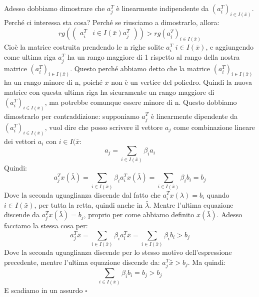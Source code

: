 \noindent Adesso dobbiamo dimostrare che $a_j^T$ è linearmente indipendente da $(a_i^T)_{i \in I(\bar{x})}$. Perché ci interessa sta cosa? Perché se riusciamo a dimostrarlo, allora:
\begin{equation*}
    rg\left(\begin{pmatrix}
    a_i^T & i \in I(\bar{x})
    a_j^T
    \end{pmatrix}\right) > rg(a_i^T)_{i \in I(\bar{x})}
\end{equation*}
Cioè la matrice costruita prendendo le n righe solite $a_i^T$ $i \in I(\bar{x})$, e aggiungendo come ultima riga $a_j^T$ ha un rango maggiore di 1 rispetto al rango della nostra matrice $(a_i^T)_{i \in I(\bar{x})}$. Questo perché abbiamo detto che la matrice $(a_i^T)_{i \in I(\bar{x})}$ ha un rango minore di n, poiché $\bar{x}$ non è un vertice del poliedro. Quindi la nuova matrice con questa ultima riga ha sicuramente un rango maggiore di $(a_i^T)_{i \in I(\bar{x})}$, ma potrebbe comunque essere minore di n. Questo dobbiamo dimostrarlo per contraddizione: supponiamo $a_j^T$ è linearmente dipendente da $(a_i^T)_{i \in I(\bar{x})}$, vuol dire che posso scrivere il vettore $a_j$ come combinazione lineare dei vettori $a_i$ con $i \in I(\bar{x}$:
\begin{equation*}
    a_j = \sum_{i \in I(\bar{x})} \beta_i a_i
\end{equation*}
Quindi:
\begin{equation*}
    a_j^Tx(\bar{\lambda}) = \sum_{i \in I(\bar{x})} \beta_i a_i^T x(\bar{\lambda}) = \sum_{i \in I(\bar{x})} \beta_i b_i = b_j
\end{equation*}
Dove la seconda uguaglianza discende dal fatto che $a_i^Tx(\lambda) = b_i$ quando $i \in I(\bar{x})$, per tutta la retta, quindi anche in $\bar{\lambda}$. Mentre l'ultima equazione discende da $a_j^Tx(\bar{\lambda}) = b_j$, proprio per come abbiamo definito $x(\bar{\lambda})$. Adesso facciamo la stessa cosa per:
\begin{equation*}
    a_j^T\bar{x} = \sum_{i \in I(\bar{x})} \beta_i a_i^T\bar{x} = \sum_{i \in I(\bar{x})} \beta_i b_i > b_j
\end{equation*}
Dove la seconda uguaglianza discende per lo stesso motivo dell'espressione precedente, mentre l'ultima equazione discende da: $a_j^T\bar{x} > b_j$. Ma quindi:
\begin{equation*}
    \sum_{i \in I(\bar{x})} \beta_i b_i = b_j > b_j
\end{equation*}
E scadiamo in un assurdo $\square$

\vspace{1cm}


